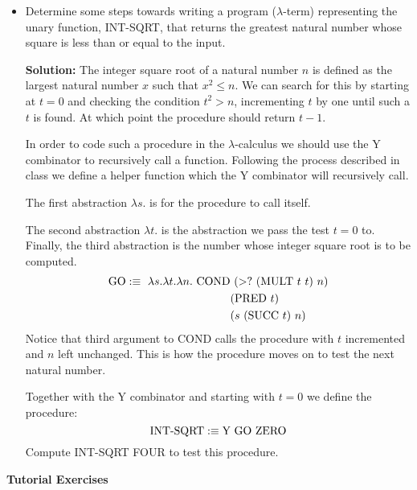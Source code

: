 \documentclass[11pt]{report}
\begin{document}
\begin{itemize}
	\item Determine some steps towards writing a program ($\lambda$-term) representing the unary function, INT-SQRT, that returns the greatest natural number whose square is less than or equal to the input. 
	
	{\bf Solution:}	The integer square root of a natural number $n$ is defined as the largest natural number $x$ such that $x^{2} \leq n$. We can search for this by starting at $t = 0$ and checking the condition $t^{2} > n$, incrementing $t$ by one until such a $t$ is found. At which point the procedure should return $t-1$. 

	In order to code such a procedure in the $\lambda$-calculus we should use the Y combinator to recursively call a function. Following the process described in class we define a helper function which the Y combinator will recursively call. 

	The first abstraction $\lambda s.$ is for the procedure to call itself. 

	The second abstraction $\lambda t.$ is the abstraction we pass the test $t=0$ to. Finally, the third abstraction is the number whose integer square root is to be computed. 
	\begin{align*}
		\GO:\equiv \  \lambda s. \lambda t. \lambda n. \ \COND &\ (>? \ (\MULT \ t \ t) \ n) \\
		&(\PRED \ t) \\
		&(s \ (\SUCC \ t) \ n)
	\end{align*}
	Notice that third argument to COND calls the procedure with $t$ incremented and $n$ left unchanged. This is how the procedure moves on to test the next natural number. 

	Together with the Y combinator and starting with $t=0$ we define the procedure: 
	$$\text{INT-SQRT} :\equiv \text{Y} \ \text{GO} \ \text{ZERO}$$
	Compute INT-SQRT FOUR to test this procedure. 

\end{itemize}

\newpage
{\bf Tutorial Exercises}
\end{document}
